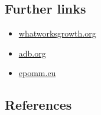 \documentclass[
]{book}
\providecommand{\tightlist}{%
  \setlength{\itemsep}{0pt}\setlength{\parskip}{0pt}}
\begin{document}
\hypertarget{further-links-7}{%
\subsection*{Further links}\label{further-links-7}}

\begin{itemize}
\tightlist
\item
  \href{https://whatworksgrowth.org/policy-reviews/transport/congestion-charging}{whatworksgrowth.org}
\item
  \href{https://www.adb.org/sites/default/files/publication/159940/introduction-congestion-charging.pdf}{adb.org}
\item
  \href{http://www.epomm.eu/newsletter/v2/content/2015/0415/doc/eupdate_en.pdf}{epomm.eu}
\end{itemize}

\hypertarget{references-8}{%
\subsection*{References}\label{references-8}}
\end{document}
